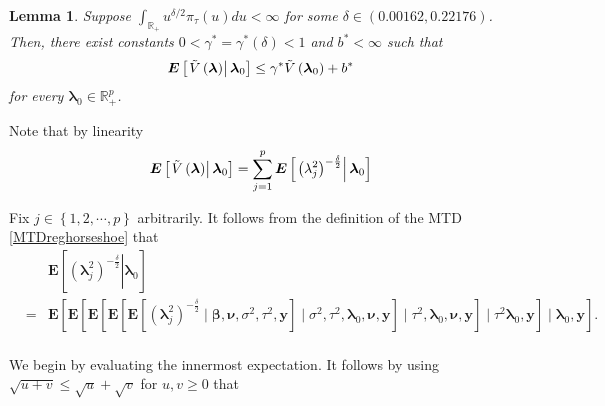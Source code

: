 \documentclass[noinfoline,11pt]{imsart}
\numberwithin{equation}{section}
\theoremstyle{plain}
\newtheorem{lem}{Lemma}[section]
\newcommand{\y}{\mathbf{y}}
\newcommand{\bl}{\boldsymbol{\lambda}}
\newcommand{\E}{\boldsymbol{E}}
\begin{document}
\begin{lem}\label{Theorem1reghorseshoe}
Suppose $\int_{\mathbb{R}_+} u^{\delta/2} \pi_\tau (u) du < \infty$ for some $\delta \in (0.00162, 0.22176)$. Then, there exist constants $0<\gamma^*=\gamma^*\left(\delta\right)<1$ and $b^*<\infty$ such that
\begin{equation}\label{driftconditionreghorseshoe}
    \E\left[\left.\Tilde{V}\left(\mathbf{\bl}\right)\right|\mathbf{\bl}_0\right]\leq \gamma^* \Tilde{V}\left(\mathbf{\bl}_0\right)+b^*
\end{equation}
for every $\bl_0\in \mathbb{R}_+^p$. \\
\end{lem}

\proof Note that by linearity 
\begin{equation} \label{reghorseshoeexpectations:linearity}
\E\left[\left.\Tilde{V}\left(\mathbf{\bl}\right)\right|\mathbf{\bl}_0\right] = \sum_{j=1}^p \E\left[\left. \left(\lambda_j^2\right)^{-\frac{\delta}{2}} \right|\mathbf{\bl}_0\right]
\end{equation}

\noindent
Fix $j\in\left\{1,2,\cdots,p\right\}$ arbitrarily. It follows from the definition of the MTD \eqref{MTDreghorseshoe} that 
\begin{eqnarray} \label{reghorseshoeexpectations:iterated}
& & \E\left[\left.\left(\bl_j^2\right)^{-\frac{\delta}{2}}\right|\mathbf{\bl}_0\right] \nonumber\\
&=& \E\left[\left.\E\left[\left.\E\left[\left.\E\left[\left.\E\left[\left.\left(\bl_j^2\right)^{-\frac{\delta}{2}}\right.\mid\boldsymbol{\beta,\nu},\sigma^2,\tau^2,\mathbf{\y}\right]\right.\mid\sigma^2,\tau^2,\mathbf{\bl}_0,\mathbf{\nu,\y}\right]\right.\mid\tau^2,\bl_0,\mathbf{\nu},\y\right]\right.\mid\tau^2\mathbf{\bl}_0,\mathbf{\y}\right]\right.\mid\bl_0,\y\right]. \nonumber\\
& & 
\end{eqnarray}

\noindent
We begin by evaluating the innermost expectation. It follows by using $\sqrt{u+v}\leq\sqrt{u}+\sqrt{v}$ for $u,v\geq 0$ that \\
\end{document}
